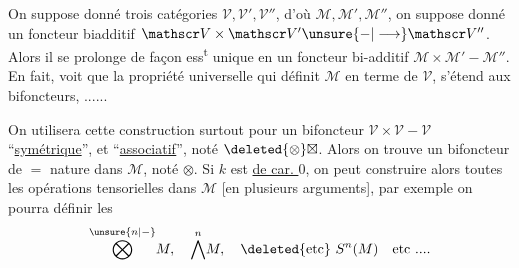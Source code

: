 On suppose donné trois catégories  $\mathscr V,\mathscr V',\mathscr V''$, d'où $\mathcal M,\mathcal M',\mathcal M''$, on suppose donné un foncteur biadditif $\mathscr V\times\mathscr V'\unsure{\mathord{-}|\longrightarrow}\mathscr V''$. Alors il se prolonge de façon ess\textsuperscript{t} unique en un foncteur bi-additif $\mathcal M\times\mathcal M'-\mathcal M''$. En fait,  voit que la propriété universelle qui définit $\mathcal M$ en terme de $\mathscr V$, s'étend aux bifoncteurs, ......

On  utilisera cette construction surtout pour un bifoncteur $\mathscr V\times\mathscr V-\mathscr V$ ``\uline{symétrique}'', et ``\uline{associatif}'', noté $\deleted{\otimes}\boxtimes$. Alors on trouve un bifoncteur de $=$ nature dans $\mathcal M$, noté $\otimes$. Si $k$ est \uline{de car. $0$}, on peut construire alors toutes les opérations tensorielles dans $\mathcal M$ [en plusieurs arguments], par exemple on pourra définir les
\[
 \overset{\unsure{n|-}}{\bigotimes} M,\quad \overset{n}{\bigwedge}M,\quad\deleted{\text{etc}}\ S^n(M)\quad\text{etc ....}
\]
